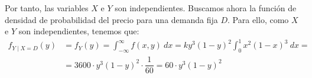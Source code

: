 \begin{ejercicio}
    Por tanto, las variables $X$ e $Y$ son independientes. Buscamos ahora la función de densidad de probabilidad del precio para una demanda fija $D$. Para ello, como $X$ e $Y$ son independientes, tenemos que:
    \begin{align*}
        f_{Y\mid X=D}(y) &= f_Y(y) = \int_{-\infty}^{\infty} f(x,y) ~d{x} = ky^3(1-y)^2\int_{0}^{1}x^2(1-x)^3 ~d{x} =\\&= 3600\cdot y^3(1-y)^2 \cdot \dfrac{1}{60} = 60\cdot y^3(1-y)^2
    \end{align*}
\end{ejercicio}